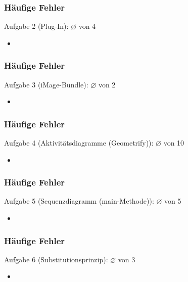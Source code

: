 \documentclass[18pt]{beamer}
\begin{document}
	\begin{frame}
		\frametitle{Häufige Fehler}
		\begin{block}{Aufgabe 2 (Plug-In): $\diameter$ von 4} %
			\begin{itemize}
				\item 	%
			\end{itemize}
		\end{block}
	\end{frame}

	\begin{frame}
		\frametitle{Häufige Fehler}
		\begin{block}{Aufgabe 3 (iMage-Bundle): $\diameter$  von 2} %
			\begin{itemize}
				\item 	%
			\end{itemize}
		\end{block}
	\end{frame}

	\begin{frame}
		\frametitle{Häufige Fehler}
		\begin{block}{Aufgabe 4 (Aktivitätsdiagramme (Geometrify)): $\diameter$ von 10} %
			\begin{itemize}
				\item 	%
			\end{itemize}
		\end{block}
	\end{frame}

	\begin{frame}
		\frametitle{Häufige Fehler}
		\begin{block}{Aufgabe 5 (Sequenzdiagramm (main-Methode)): $\diameter$ von 5} %
			\begin{itemize}
				\item %
			\end{itemize}
		\end{block}
	\end{frame}

	\begin{frame}
		\frametitle{Häufige Fehler}
		\begin{block}{Aufgabe 6 (Substitutionsprinzip): $\diameter$ von 3} %
			\begin{itemize}
				\item 	%
			\end{itemize}
		\end{block}
	\end{frame}
\end{document}
